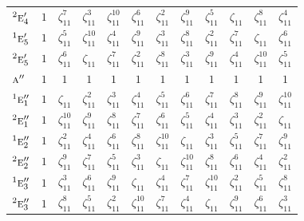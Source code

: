 \documentclass[10pt,a4paper]{article}
\numberwithin{equation}{section}
\newcommand{\irr}[1]{\text{\normalfont\scshape #1}}
\newcommand{\conjpair}[1]{{}^{#1}}
\newcommand{\rootunity}[1]{\zeta_{#1}}
\begin{document}
{\begin{longtable}{@{}lccccccccccc@{}}
$\conjpair{2}\irr{e}_{4}'$ & $1$ & $\rootunity{11}^{7}$ & $\rootunity{11}^{3}$ & $\rootunity{11}^{10}$ & $\rootunity{11}^{6}$ & $\rootunity{11}^{2}$ & $\rootunity{11}^{9}$ & $\rootunity{11}^{5}$ & $\rootunity{11}$ & $\rootunity{11}^{8}$ & $\rootunity{11}^{4}$\\
$\conjpair{1}\irr{e}_{5}'$ & $1$ & $\rootunity{11}^{5}$ & $\rootunity{11}^{10}$ & $\rootunity{11}^{4}$ & $\rootunity{11}^{9}$ & $\rootunity{11}^{3}$ & $\rootunity{11}^{8}$ & $\rootunity{11}^{2}$ & $\rootunity{11}^{7}$ & $\rootunity{11}$ & $\rootunity{11}^{6}$\\
$\conjpair{2}\irr{e}_{5}'$ & $1$ & $\rootunity{11}^{6}$ & $\rootunity{11}$ & $\rootunity{11}^{7}$ & $\rootunity{11}^{2}$ & $\rootunity{11}^{8}$ & $\rootunity{11}^{3}$ & $\rootunity{11}^{9}$ & $\rootunity{11}^{4}$ & $\rootunity{11}^{10}$ & $\rootunity{11}^{5}$\\
$\irr{a}''$ & $1$ & $1$ & $1$ & $1$ & $1$ & $1$ & $1$ & $1$ & $1$ & $1$ & $1$\\
$\conjpair{1}\irr{e}_{1}''$ & $1$ & $\rootunity{11}$ & $\rootunity{11}^{2}$ & $\rootunity{11}^{3}$ & $\rootunity{11}^{4}$ & $\rootunity{11}^{5}$ & $\rootunity{11}^{6}$ & $\rootunity{11}^{7}$ & $\rootunity{11}^{8}$ & $\rootunity{11}^{9}$ & $\rootunity{11}^{10}$\\
$\conjpair{2}\irr{e}_{1}''$ & $1$ & $\rootunity{11}^{10}$ & $\rootunity{11}^{9}$ & $\rootunity{11}^{8}$ & $\rootunity{11}^{7}$ & $\rootunity{11}^{6}$ & $\rootunity{11}^{5}$ & $\rootunity{11}^{4}$ & $\rootunity{11}^{3}$ & $\rootunity{11}^{2}$ & $\rootunity{11}$\\
$\conjpair{1}\irr{e}_{2}''$ & $1$ & $\rootunity{11}^{2}$ & $\rootunity{11}^{4}$ & $\rootunity{11}^{6}$ & $\rootunity{11}^{8}$ & $\rootunity{11}^{10}$ & $\rootunity{11}$ & $\rootunity{11}^{3}$ & $\rootunity{11}^{5}$ & $\rootunity{11}^{7}$ & $\rootunity{11}^{9}$\\
$\conjpair{2}\irr{e}_{2}''$ & $1$ & $\rootunity{11}^{9}$ & $\rootunity{11}^{7}$ & $\rootunity{11}^{5}$ & $\rootunity{11}^{3}$ & $\rootunity{11}$ & $\rootunity{11}^{10}$ & $\rootunity{11}^{8}$ & $\rootunity{11}^{6}$ & $\rootunity{11}^{4}$ & $\rootunity{11}^{2}$\\
$\conjpair{1}\irr{e}_{3}''$ & $1$ & $\rootunity{11}^{3}$ & $\rootunity{11}^{6}$ & $\rootunity{11}^{9}$ & $\rootunity{11}$ & $\rootunity{11}^{4}$ & $\rootunity{11}^{7}$ & $\rootunity{11}^{10}$ & $\rootunity{11}^{2}$ & $\rootunity{11}^{5}$ & $\rootunity{11}^{8}$\\
$\conjpair{2}\irr{e}_{3}''$ & $1$ & $\rootunity{11}^{8}$ & $\rootunity{11}^{5}$ & $\rootunity{11}^{2}$ & $\rootunity{11}^{10}$ & $\rootunity{11}^{7}$ & $\rootunity{11}^{4}$ & $\rootunity{11}$ & $\rootunity{11}^{9}$ & $\rootunity{11}^{6}$ & $\rootunity{11}^{3}$\\

\end{longtable}}
\end{document}
